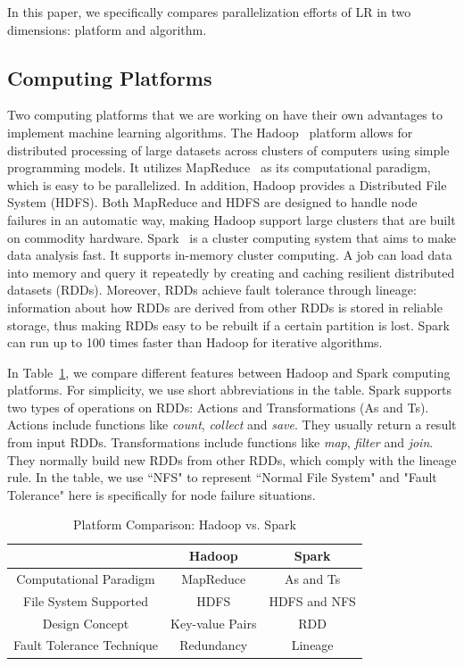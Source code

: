 \documentclass[10pt, conference, compsocconf]{IEEEtran}
\begin{document}
In this paper, we specifically compares parallelization efforts of LR in two dimensions: platform and algorithm.
\subsection{Computing Platforms}\label{sec:platform}
Two computing platforms that we are working on have their own advantages to implement machine learning algorithms.
The Hadoop~\cite{white2012hadoop} platform allows for distributed processing of large datasets across clusters of computers using simple programming models. It utilizes MapReduce~\cite{dean2008mapreduce} as its computational paradigm, which is easy to be parallelized. In addition, Hadoop provides a Distributed File System (HDFS). Both MapReduce and HDFS are designed to handle node failures in an automatic way, making Hadoop support large clusters that are built on commodity hardware.
Spark~\cite{zaharia2010spark} is a cluster computing system that aims to make data analysis fast. It supports in-memory cluster computing. A job can load data into memory and query it repeatedly by creating and caching resilient distributed datasets (RDDs). Moreover, RDDs achieve fault tolerance through lineage: information about how RDDs are derived from other RDDs is stored in reliable storage, thus making RDDs easy to be rebuilt if a certain partition is lost. Spark can run up to 100 times faster than Hadoop for iterative algorithms.

In Table~\ref{tab:systemcmp}, we compare different features between Hadoop and Spark computing platforms.
For simplicity, we use short abbreviations in the table.
Spark supports two types of operations on RDDs: Actions and Transformations (As and Ts).
Actions include functions like \textit{count}, \textit{collect} and \textit{save}. They usually return a result from input RDDs.
Transformations include functions like \textit{map}, \textit{filter} and \textit{join}. They normally build new RDDs from other RDDs, which comply with the lineage rule.
In the table, we use ``NFS" to represent ``Normal File System" and "Fault Tolerance" here is specifically for node failure situations.
\begin{table}[h]
\centering
\caption{Platform Comparison: Hadoop vs. Spark}\label{tab:systemcmp}\vspace{-0.3cm}
\begin{tabular}{|c|c|c|}
\hline
           & Hadoop & Spark \\
\hline
Computational Paradigm  & MapReduce & As and Ts \\
\hline
File System Supported & HDFS & HDFS and NFS \\
\hline
Design Concept  & Key-value Pairs & RDD \\
\hline
Fault Tolerance Technique & Redundancy & Lineage \\
\hline
\end{tabular}\vspace{-0.5cm}
\end{table}
\end{document}
